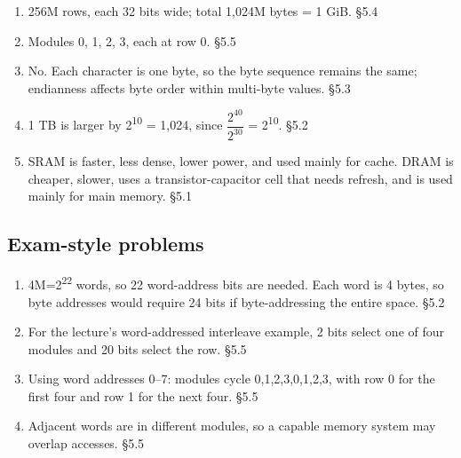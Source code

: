 \documentclass[11pt]{article}
\begin{document}
\begin{keepsection}
\begin{enumerate}
\item 256M rows, each 32 bits wide; total 1,024M bytes = 1 GiB. \hfill{\small\color{FAUblue}§5.4}
\item Modules 0, 1, 2, 3, each at row 0. \hfill{\small\color{FAUblue}§5.5}
\item No. Each character is one byte, so the byte sequence remains the same; endianness affects byte order within multi-byte values. \hfill{\small\color{FAUblue}§5.3}
\item 1 TB is larger by 2\textsuperscript{10} = 1,024, since {\small\ensuremath{\dfrac{2^{40}}{2^{30}}}} = 2\textsuperscript{10}. \hfill{\small\color{FAUblue}§5.2}
\item SRAM is faster, less dense, lower power, and used mainly for cache. DRAM is cheaper, slower, uses a transistor-capacitor cell that needs refresh, and is used mainly for main memory. \hfill{\small\color{FAUblue}§5.1}
\end{enumerate}

\end{keepsection}
\begin{keepsection}\subsection{Exam-style problems}

\begin{enumerate}
\item 4M=2\textsuperscript{22} words, so 22 word-address bits are needed. Each word is 4 bytes, so byte addresses would require 24 bits if byte-addressing the entire space. \hfill{\small\color{FAUblue}§5.2}
\item For the lecture’s word-addressed interleave example, 2 bits select one of four modules and 20 bits select the row. \hfill{\small\color{FAUblue}§5.5}
\item Using word addresses 0–7: modules cycle 0,1,2,3,0,1,2,3, with row 0 for the first four and row 1 for the next four. \hfill{\small\color{FAUblue}§5.5}
\item Adjacent words are in different modules, so a capable memory system may overlap accesses. \hfill{\small\color{FAUblue}§5.5}
\end{enumerate}

\end{keepsection}
\end{document}
